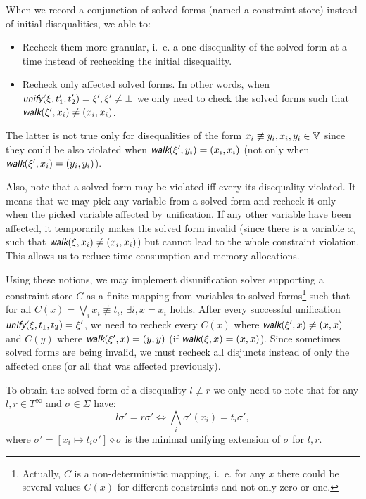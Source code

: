 When we record a conjunction of solved forms (named a constraint store) instead of initial disequalities, we able to:
\begin{itemize}
    \item Recheck them more granular, i.~e. a one disequality of the solved form at a time instead of rechecking the initial disequality.
    \item Recheck only affected solved forms. In other words, when $\unify(\xi, t_1', t_2') = \xi', \xi' \neq \bot$ we only need to check the solved forms such that $\walk(\xi', x_i) \neq (x_i, x_i)$.
\end{itemize}

The latter is not true only for disequalities of the form $x_i \not\equiv y_i, x_i, y_i \in \mathbb{V}$ since they could be also violated when $\walk(\xi', y_i) = (x_i, x_i)$ (not only when $\walk(\xi', x_i) = (y_i, y_i)$).

Also, note that a solved form may be violated iff every its disequality violated. It means that we may pick any variable from a solved form and recheck it only when the picked variable affected by unification. If any other variable have been affected, it temporarily makes the solved form invalid (since there is a variable $x_i$ such that $\walk(\xi, x_i) \neq (x_i, x_i)$) but cannot lead to the whole constraint violation. This allows us to reduce time consumption and memory allocations.

Using these notions, we may implement disunification solver supporting a constraint store $C$ as a finite mapping from variables to solved forms\footnote{Actually, $C$ is a non-deterministic mapping, i.~e. for any $x$ there could be several values $C(x)$ for different constraints and not only zero or one.} such that for all $C(x) = \bigvee_i x_i \not\equiv t_i$, $\exists i, x = x_i$ holds. After every successful unification $\unify(\xi, t_1, t_2) = \xi'$, we need to recheck every $C(x)$ where $\walk(\xi', x) \neq (x, x)$ and $C(y)$ where $\walk(\xi', x) = (y, y)$ (if $\walk(\xi, x) = (x, x)$). Since sometimes solved forms are being invalid, we must recheck all disjuncts instead of only the affected ones (or all that was affected previously).

To obtain the solved form of a disequality $l \not\equiv r$ we only need to note that for any $l, r \in T^\infty$ and $\sigma \in \Sigma$ have:
\[l \sigma' = r \sigma' \Leftrightarrow \bigwedge_i \sigma'(x_i) = t_i \sigma',\]
where $\sigma' = [x_i \mapsto t_i \sigma'] \diamond \sigma$ is the minimal unifying extension of $\sigma$ for $l, r$.

